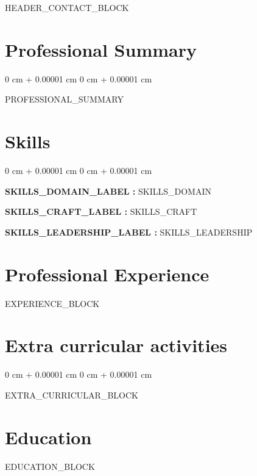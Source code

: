 ﻿\documentclass[10pt, letterpaper]{article}
\newenvironment{onecolentry}{
    \begin{adjustwidth}{
        0 cm + 0.00001 cm
    }{
        0 cm + 0.00001 cm
    }
}{
    \end{adjustwidth}
} %
\newenvironment{header}{
    \setlength{\topsep}{0pt}\par\kern\topsep\centering\linespread{1.5}
}{
    \par\kern\topsep
} %
\begin{document}
    \begin{header}
        \fontsize{25 pt}{25 pt}

        \vspace{5 pt}

        \normalsize
        {{HEADER_CONTACT_BLOCK}}
    \end{header}

    \section{Professional Summary}
    \begin{onecolentry}
    {{PROFESSIONAL_SUMMARY}}
    \end{onecolentry}

    \section{Skills}
    \begin{onecolentry}
        \textbf{ {{SKILLS_DOMAIN_LABEL}} :} {{SKILLS_DOMAIN}}

        \vspace{0.2 cm}
        \textbf{ {{SKILLS_CRAFT_LABEL}} :} {{SKILLS_CRAFT}}

        \vspace{0.2 cm}
        \textbf{ {{SKILLS_LEADERSHIP_LABEL}} :} {{SKILLS_LEADERSHIP}}

    \end{onecolentry}

    \section{Professional Experience}

    {{EXPERIENCE_BLOCK}}

    \section{Extra curricular activities}
    \begin{onecolentry}
        {{EXTRA_CURRICULAR_BLOCK}}
    \end{onecolentry}

    \section{Education}

    {{EDUCATION_BLOCK}}
\end{document}
